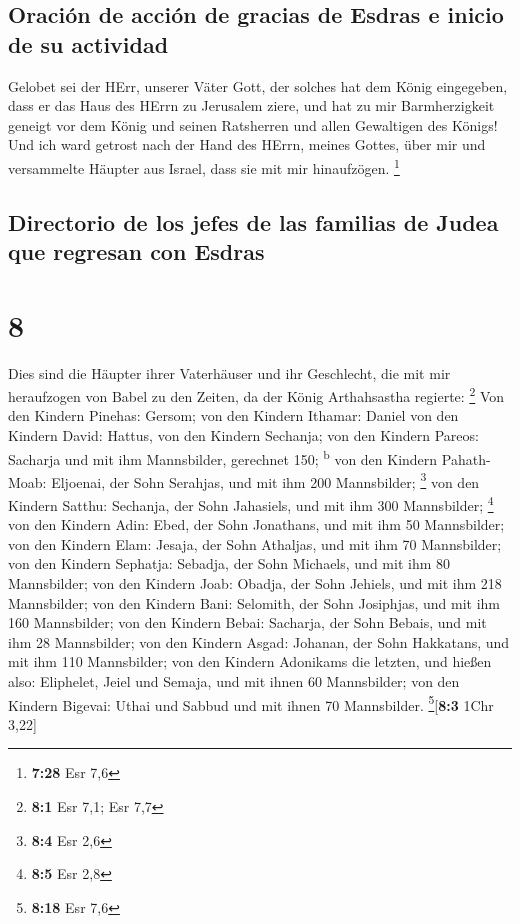 \hypertarget{oraciuxf3n-de-acciuxf3n-de-gracias-de-esdras-e-inicio-de-su-actividad}{%
\subsection{Oración de acción de gracias de Esdras e inicio de su
actividad}\label{oraciuxf3n-de-acciuxf3n-de-gracias-de-esdras-e-inicio-de-su-actividad}}

 Gelobet sei der HErr, unserer Väter Gott, der solches
hat dem König eingegeben, dass er das Haus des HErrn zu Jerusalem ziere,
 und hat zu mir Barmherzigkeit geneigt vor dem König und
seinen Ratsherren und allen Gewaltigen des Königs! Und ich ward getrost
nach der Hand des HErrn, meines Gottes, über mir und versammelte Häupter
aus Israel, dass sie mit mir hinaufzögen. \footnote{\textbf{7:28} Esr
  7,6}

\hypertarget{directorio-de-los-jefes-de-las-familias-de-judea-que-regresan-con-esdras}{%
\subsection{Directorio de los jefes de las familias de Judea que
regresan con
Esdras}\label{directorio-de-los-jefes-de-las-familias-de-judea-que-regresan-con-esdras}}

\hypertarget{section-7}{%
\section{8}\label{section-7}}

 Dies sind die Häupter ihrer Vaterhäuser und ihr
Geschlecht, die mit mir heraufzogen von Babel zu den Zeiten, da der
König Arthahsastha regierte: \footnote{\textbf{8:1} Esr 7,1; Esr 7,7}
 Von den Kindern Pinehas: Gersom; von den Kindern Ithamar:
Daniel von den Kindern David: Hattus,  von den Kindern
Sechanja; von den Kindern Pareos: Sacharja und mit ihm Mannsbilder,
gerechnet 150; \textsuperscript{b}  von den Kindern
Pahath-Moab: Eljoenai, der Sohn Serahjas, und mit ihm 200 Mannsbilder;
\footnote{\textbf{8:4} Esr 2,6}  von den Kindern Satthu:
Sechanja, der Sohn Jahasiels, und mit ihm 300 Mannsbilder; \footnote{\textbf{8:5}
  Esr 2,8}  von den Kindern Adin: Ebed, der Sohn
Jonathans, und mit ihm 50 Mannsbilder;  von den Kindern
Elam: Jesaja, der Sohn Athaljas, und mit ihm 70 Mannsbilder;
 von den Kindern Sephatja: Sebadja, der Sohn Michaels, und
mit ihm 80 Mannsbilder;  von den Kindern Joab: Obadja, der
Sohn Jehiels, und mit ihm 218 Mannsbilder;  von den
Kindern Bani: Selomith, der Sohn Josiphjas, und mit ihm 160 Mannsbilder;
 von den Kindern Bebai: Sacharja, der Sohn Bebais, und
mit ihm 28 Mannsbilder;  von den Kindern Asgad: Johanan,
der Sohn Hakkatans, und mit ihm 110 Mannsbilder;  von den
Kindern Adonikams die letzten, und hießen also: Eliphelet, Jeiel und
Semaja, und mit ihnen 60 Mannsbilder;  von den Kindern
Bigevai: Uthai und Sabbud und mit ihnen 70 Mannsbilder.
\footnote{\textbf{8:18} Esr 7,6}{[}\textbf{8:3} 1Chr 3,22{]}

